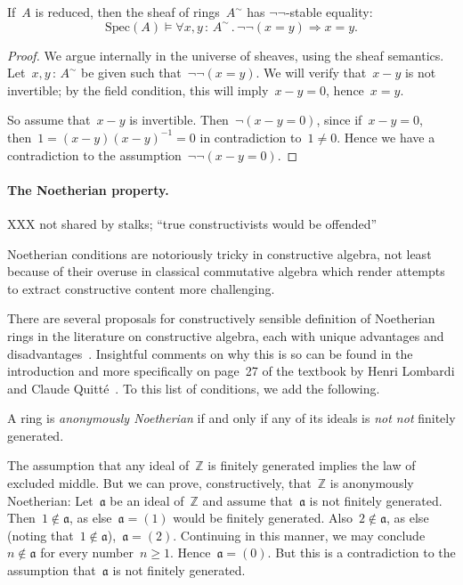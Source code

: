 \documentclass{ws-rv9x6}
\newcommand{\ZZ}{\mathbb{Z}}
\newcommand{\aaa}{\mathfrak{a}}
\newcommand{\Spec}{\mathrm{Spec}}
\renewcommand{\_}{\mathpunct{.}}
\newcommand{\?}{\,{:}\,}
\newcommand{\notnot}{\emph{not not}\xspace}
\begin{document}
\begin{proposition}If~$A$ is reduced, then the sheaf of rings~$A^\sim$ has $\neg\neg$-stable equality:
\[ \Spec(A) \models \forall x,y\?A^\sim\_ \neg\neg(x = y) \Rightarrow x = y. \]
\end{proposition}

\begin{proof}We argue internally in the universe of sheaves, using the sheaf
semantics. Let~$x,y \? A^\sim$ be given such
that~$\neg\neg(x = y)$. We will verify that~$x - y$ is not invertible; by the
field condition, this will imply~$x - y = 0$, hence~$x = y$.

So assume that~$x - y$ is invertible. Then~$\neg(x - y = 0)$, since if~$x - y =
0$, then~$1 = (x-y) (x-y)^{-1} = 0$ in contradiction to~$1 \neq 0$. Hence we have a
contradiction to the assumption~$\neg\neg(x-y=0)$.\end{proof}


\paragraph{The Noetherian property.}
XXX not shared by stalks; ``true constructivists would be offended''

Noetherian conditions are notoriously tricky in constructive algebra, not
least because of their overuse in classical commutative algebra which render
attempts to extract constructive content more challenging.

There are several proposals for constructively sensible definition of
Noetherian rings in the literature on constructive algebra, each with unique
advantages and
disadvantages~\cite{richman:noetherian,mines-richman-ruitenburg:constructive-algebra,perdry:noetherian,perdry:lazy,perdry-schuster:noetherian,tennenbaum:hilbert}.
Insightful comments on why this is so can be found in the introduction and more
specifically on page~27 of the textbook by Henri Lombardi and Claude
Quitté~\cite{lombardi-quitte:constructive-algebra}. To this list of conditions,
we add the following.

\begin{definition}
\label{defn:anonymously-noetherian}
A ring is \emph{anonymously Noetherian} if and only if any of its ideals is
\notnot finitely generated.
\end{definition}

\begin{example}The assumption that any ideal of~$\ZZ$ is finitely generated implies
the law of excluded middle. But we can prove, constructively, that~$\ZZ$ is
anonymously Noetherian: Let~$\aaa$ be an ideal of~$\ZZ$ and assume that~$\aaa$
is not finitely generated. Then~$1 \not\in \aaa$, as else~$\aaa = (1)$ would be
finitely generated. Also~$2 \not\in \aaa$, as else (noting
that~$1\not\in\aaa$),~$\aaa = (2)$. Continuing in this manner, we may
conclude~$n \not\in \aaa$ for every number~$n \geq 1$. Hence~$\aaa = (0)$. But
this is a contradiction to the assumption that~$\aaa$ is not finitely
generated.
\end{example}
\end{document}
